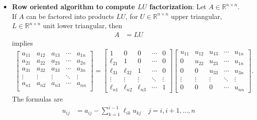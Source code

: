\documentclass{report}
\begin{document}
\begin{itemize}
        \item \textbf{Row oriented algorithm to compute $LU $ factorization}:
            Let $A \in \mathbb{R}^{n\times n}$. If $A$ can be factored into products $LU$, for $U \in \mathbb{R}^{n\times n}$ upper triangular, $L \in \mathbb{R}^{n\times n}$ unit lower triangular, then
            \begin{align*}
                A &= LU  
            \end{align*}
            implies
            \begin{align*}
                \begin{bmatrix}
                    a_{11} & a_{12} & a_{13} & \cdots & a_{1n} \\
                    a_{21} & a_{22} & a_{23} & \cdots & a_{2n} \\
                    a_{31} & a_{32} & a_{33} & \cdots & a_{3n} \\
                    \vdots & \vdots & \vdots & \ddots & \vdots \\
                    a_{n1} & a_{n2} & a_{n3} & \cdots & a_{nn} \\
                \end{bmatrix}
                = \begin{bmatrix}
                    1 & 0 & 0 & \cdots & 0 \\
                    \ell_{21} & 1 & 0 & \cdots & 0 \\
                    \ell_{31} & \ell_{32} & 1 & \cdots & 0 \\
                    \vdots & \vdots & \vdots & \ddots & \vdots \\
                    \ell_{n1} & \ell_{n2} & \ell_{n3} & \cdots & 1
                \end{bmatrix}
                \begin{bmatrix}
                    u_{11} & u_{12} & u_{13} & \cdots & u_{1n} \\
                    0  & u_{22} & u_{23} & \cdots & u_{1n} \\
                    0& 0& u_{33} & \cdots & u_{3n} \\
                    \vdots & \vdots & \vdots & \ddots & \vdots \\
                    0 & 0 & 0 & \cdots & u_{nn}
                \end{bmatrix}
            .\end{align*}
            The formulas are
        \begin{align*}
            u_{ij} &= a_{ij} - \sum_{k=1}^{i-1}\ell_{ik}u_{kj} \quad j=i,i+1,...,n \tag{1} \\

\end{align*}
\end{itemize}
\end{document}
